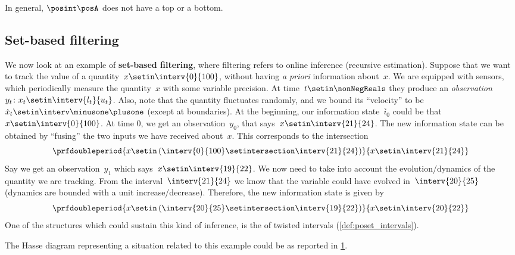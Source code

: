 In general, $\posint\posA$ does not have a top or a bottom.

\vfill
\clearpage

\subsection{Set-based filtering}
We now look at an example of \textbf{set-based filtering}, where filtering refers to online inference (recursive estimation).
Suppose that we want to track the value of a quantity~$x\setin \interv{0}{100}$, without having \emph{a priori} information about~$x$.
We are equipped with sensors, which periodically measure the quantity~$x$ with some variable precision.
At time~$t\setin \nonNegReals$ they produce an \emph{observation}~$y_t\colon x_t\setin \interv{l_t}{u_t}$.
Also, note that the quantity fluctuates randomly, and we bound its ``velocity'' to be~$\dot{x}_t\setin \interv\minusone\plusone$ (except at boundaries).
At the beginning, our information state~$\bar{i}_0$ could be that~$x\setin \interv{0}{100}$.
At time 0, we get an observation~$y_0$, that says~$x\setin \interv{21}{24}$.
The new information state can be obtained by ``fusing'' the two inputs we have received about~$x$.
This corresponds to the intersection
\begin{equation}\label{eq:filtering-2}
    \prfdoubleperiod{
        x\setin \left( \interv{0}{100} \setintersection \interv{21}{24}\right)
    }{
        x\setin \interv{21}{24}
    }
\end{equation}
Say we get an observation~$y_1$ which says~$x\setin \interv{19}{22}$.
We now need to take into account the evolution/dynamics of the quantity we are tracking.
From the interval~$\interv{21}{24}$ we know that the variable could have evolved in~$\interv{20}{25}$ (dynamics are bounded with a unit increase/decrease).
Therefore, the new information state is given by
\begin{equation}\label{eq:filtering-3}
    \prfdoubleperiod{
        x\setin \left( \interv{20}{25} \setintersection \interv{19}{22}\right)
    }{
        x\setin \interv{20}{22}
    }
\end{equation}
One of the structures which could sustain this kind of inference, is the  of twisted intervals  (\cref{def:poset_intervals}).

The Hasse diagram representing a situation related to this example could be as reported in \cref{fig:hasse_filtering}.
\begin{figure}[h!]
    \centering
    \caption{}
    \label{fig:hasse_filtering}
\end{figure}
